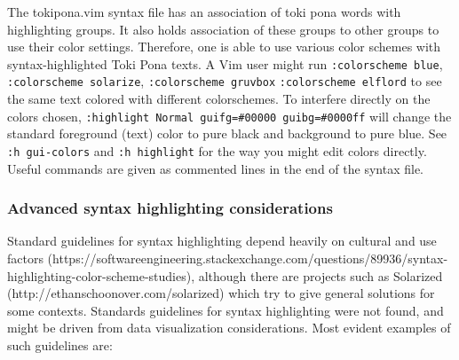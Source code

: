 \documentclass{article}
\newcommand{\tttt}[1]{\texttt{#1}}
\begin{document}
The tokipona.vim syntax file has an association of toki pona
words with highlighting groups.
It also holds association of these groups to other groups
to use their color settings.
Therefore, one is able to use various color schemes
with syntax-highlighted Toki Pona texts.
A Vim user might run \tttt{:colorscheme blue},
\tttt{:colorscheme solarize}, \tttt{:colorscheme gruvbox}
\tttt{:colorscheme elflord} to see the same text colored
with different colorschemes.
To interfere directly on the colors chosen,
\tttt{:highlight Normal guifg=\#00000 guibg=\#0000ff}
will change the standard foreground (text) color to pure black
and background to pure blue.
See \tttt{:h gui-colors} and \tttt{:h highlight}
for the way you might edit colors directly.
Useful commands are given as commented lines
in the end of the syntax file.

\subsubsection{Advanced syntax highlighting considerations}
Standard guidelines for syntax highlighting
depend heavily on cultural and use factors
(https://softwareengineering.stackexchange.com/questions/89936/syntax-highlighting-color-scheme-studies),
although there are projects such as Solarized~\cite{solazired}
(http://ethanschoonover.com/solarized)
which try to give general solutions for some contexts.
Standards guidelines for syntax highlighting were not found,
and might be driven from data visualization considerations.
Most evident examples of such guidelines are:
\end{document}
